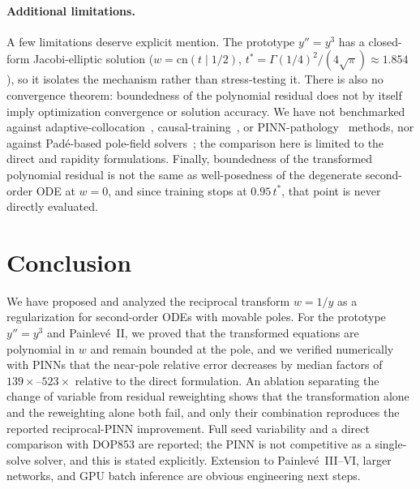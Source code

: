 \documentclass[11pt,a4paper]{article}
\theoremstyle{definition}
\begin{document}
\paragraph{Additional limitations.} A few limitations deserve explicit mention. The prototype $y''=y^3$ has a closed-form Jacobi-elliptic solution ($w = \mathrm{cn}(t \mid 1/2)$, $t^* = \Gamma(1/4)^2/(4\sqrt{\pi}) \approx 1.854$), so it isolates the mechanism rather than stress-testing it. There is also no convergence theorem: boundedness of the polynomial residual does not by itself imply optimization convergence or solution accuracy. We have not benchmarked against adaptive-collocation~\cite{Wu2023Adaptive,ARGUS2026}, causal-training~\cite{Wang2024Causal,GaussianCausal2026}, or PINN-pathology~\cite{Krishnapriyan2021,FP64NeurIPS2025} methods, nor against Pad\'e-based pole-field solvers~\cite{Fornberg2011}; the comparison here is limited to the direct and rapidity formulations. Finally, boundedness of the transformed polynomial residual is not the same as well-posedness of the degenerate second-order ODE at $w=0$, and since training stops at $0.95\,t^*$, that point is never directly evaluated.


\section{Conclusion}
\label{sec:conclusion}

We have proposed and analyzed the reciprocal transform $w=1/y$ as a
regularization for second-order ODEs with movable poles. For the
prototype $y''=y^3$ and Painlev\'e~II, we proved that the transformed
equations are polynomial in $w$ and remain bounded at the pole,
and we verified numerically with PINNs that the near-pole relative
error decreases by median factors of $139\times$--$523\times$ relative to the
direct formulation. An ablation separating the change of variable from residual reweighting shows that the transformation alone and the reweighting alone both fail, and only their combination reproduces the reported reciprocal-PINN improvement. Full seed variability
and a direct comparison with DOP853 are reported; the PINN is not
competitive as a single-solve solver, and this is stated explicitly. Extension to Painlev\'e~III--VI, larger networks, and
GPU batch inference are obvious engineering next steps.

\end{document}
